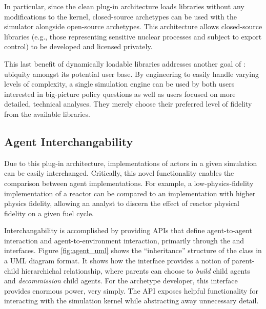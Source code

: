In particular, since the clean plug-in architecture loads libraries without any
modifications to the \Cyclus kernel, closed-source archetypes can be used with
the simulator alongside open-source archetypes. This architecture
allows closed-source libraries (e.g., those representing sensitive nuclear
processes and subject to export control) to be developed and licensed privately.

This last benefit of dynamically loadable libraries addresses
another goal of \Cyclus: ubiquity amongst its potential user base. By
engineering \Cyclus to easily handle varying levels of complexity, a single
simulation engine can be used by both users interested in big-picture policy
questions as well as users focused on more detailed, technical
analyses. They merely choose their preferred level of fidelity from the 
available libraries. 

\subsection{Agent Interchangability}\label{sec:interchangeability}

Due to this plug-in architecture,
implementations of actors in a given simulation can be easily
interchanged. Critically, this novel functionality enables the comparison
between agent implementations. For example, a low-physics-fidelity
implementation of a reactor can be compared to an implementation with higher
physics fidelity, allowing an analyst to discern the effect of reactor physical
fidelity on a given fuel cycle. 

Interchangability is accomplished by providing \glspl{API} that define agent-to-agent
interaction and agent-to-environment interaction, primarily through the
 and  interfaces. Figure \ref{fig:agent_uml} shows 
the ``inheritance'' structure of the  class in a \gls{UML} diagram 
format. It shows how the  interface
provides a notion of parent-child hierarchichal relationship, where parents can
choose to \textit{build} child agents and \textit{decommission} child
agents. For the archetype developer, this interface provides enormous power, 
very simply. The \gls{API} exposes  helpful functionality for 
interacting with the \Cyclus simulation kernel while abstracting away unnecessary 
detail.

